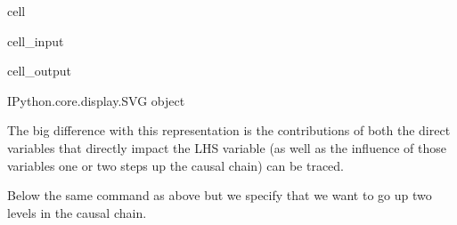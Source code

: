 \documentclass[letterpaper,10pt,english]{jupyterBook}
\begin{document}
\begin{sphinxuseclass}{cell}\begin{sphinxVerbatimInput}

\begin{sphinxuseclass}{cell_input}
\begin{sphinxVerbatim}[commandchars=\\\{\}]
 
     
\end{sphinxVerbatim}

\end{sphinxuseclass}\end{sphinxVerbatimInput}
\begin{sphinxVerbatimOutput}

\begin{sphinxuseclass}{cell_output}
\begin{sphinxVerbatim}[commandchars=\\\{\}]
\PYGZlt{}IPython.core.display.SVG object\PYGZgt{}
\end{sphinxVerbatim}

\end{sphinxuseclass}\end{sphinxVerbatimOutput}

\end{sphinxuseclass}
\sphinxAtStartPar
The big difference with this representation is the contributions of both the direct variables that directly impact the LHS variable (as well as the influence of those variables one or two steps up the causal chain) can be traced.

\sphinxAtStartPar
Below the same command as above but we specify that we want to go up two levels in the causal chain.
\end{document}
